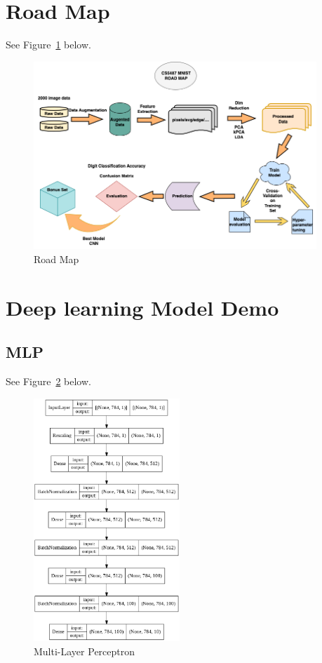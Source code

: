 \documentclass{article}
\begin{document}
\section{Road Map} \label{map}
See Figure~\ref{fig:map} below.
\begin{figure}
  \includegraphics[width=0.95\textwidth]{figure/CS5487.drawio.png}
  \caption{Road Map}
  \label{fig:map}
\end{figure}
\section{Deep learning Model Demo}
\subsection{MLP} \label{nn}
See Figure~\ref{nn_demo} below.
\begin{figure}[h]
    \centering
    \includegraphics[width=0.49\textwidth]{figure/custom-mlp.png}
    \caption{Multi-Layer Perceptron}
    \label{nn_demo}
\end{figure}
\end{document}
